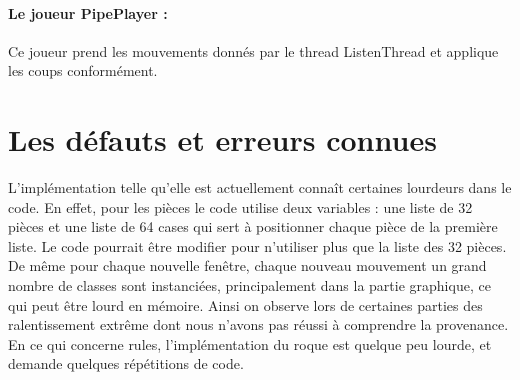 \documentclass[a4paper]{article}
\begin{document}
\paragraph{Le joueur PipePlayer :}Ce joueur prend les mouvements donnés par le thread ListenThread et applique les coups conformément. 

\section{Les défauts et erreurs connues}

L'implémentation telle qu'elle est actuellement connaît certaines lourdeurs dans le code. En effet, pour les pièces le code utilise deux variables : une liste de 32 pièces et une liste de 64 cases qui sert à positionner chaque pièce de la première liste. Le code pourrait être modifier pour n'utiliser plus que la liste des 32 pièces. \\

De même pour chaque nouvelle fenêtre, chaque nouveau mouvement un grand nombre de classes sont instanciées, principalement dans la partie graphique, ce qui peut être lourd en mémoire. Ainsi on observe lors de certaines parties des ralentissement extrême dont nous n'avons pas réussi à comprendre la provenance. \\ 

En ce qui concerne rules, l'implémentation du roque est quelque peu lourde, et demande quelques répétitions de code. \\
\end{document}
